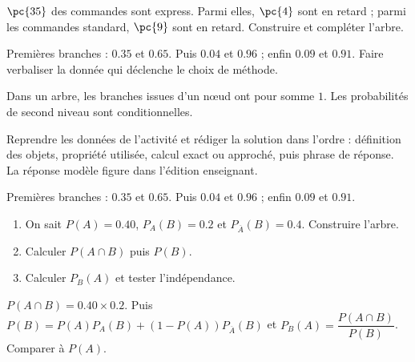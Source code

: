     \begin{activity}
    $\pc{35}$ des commandes sont express. Parmi elles, $\pc{4}$ sont en retard ; parmi les commandes standard, $\pc{9}$ sont en retard. Construire et compléter l'arbre.
    \begin{center}\end{center}
    \end{activity}
    \begin{solution}Premières branches : $\num{0,35}$ et $\num{0,65}$. Puis $\num{0,04}$ et $\num{0,96}$ ; enfin $\num{0,09}$ et $\num{0,91}$. Faire verbaliser la donnée qui déclenche le choix de méthode.\end{solution}

    \begin{summary}Dans un arbre, les branches issues d'un nœud ont pour somme $1$. Les probabilités de second niveau sont conditionnelles.\end{summary}

    \begin{example}
    Reprendre les données de l'activité et rédiger la solution dans l'ordre : définition des objets, propriété utilisée, calcul exact ou approché, puis phrase de réponse. La réponse modèle figure dans l'édition enseignant.
    \end{example}
    \begin{solution}Premières branches : $\num{0,35}$ et $\num{0,65}$. Puis $\num{0,04}$ et $\num{0,96}$ ; enfin $\num{0,09}$ et $\num{0,91}$.\end{solution}

    \begin{exercise}[essentiel]
    \begin{enumerate}\item On sait $P(A)=\num{0,40}$, $P_A(B)=\num{0,2}$ et $P_{\overline A}(B)=\num{0,4}$. Construire l'arbre.\item Calculer $P(A\cap B)$ puis $P(B)$.\item Calculer $P_B(A)$ et tester l'indépendance.\end{enumerate}
    \end{exercise}
    \begin{solution}$P(A\cap B)=\num{0,40}\times\num{0,2}$. Puis $P(B)=P(A)P_A(B)+(1-P(A))P_{\overline A}(B)$ et $P_B(A)=\dfrac{P(A\cap B)}{P(B)}$. Comparer à $P(A)$.\end{solution}

